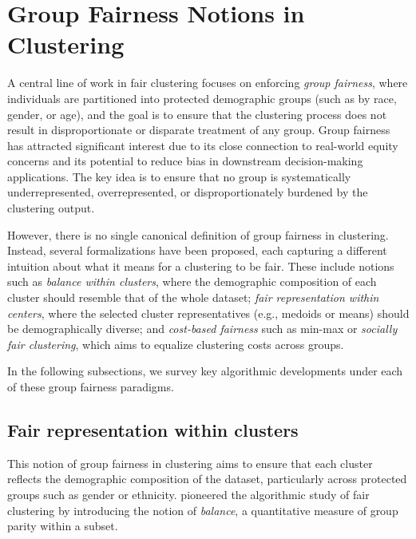 \section{Group Fairness Notions in Clustering}\label{sec:group-fairness}

A central line of work in fair clustering focuses on enforcing \emph{group fairness}, where individuals are partitioned into protected demographic groups (such as by race, gender, or age), and the goal is to ensure that the clustering process does not result in disproportionate or disparate treatment of any group. Group fairness has attracted significant interest due to its close connection to real-world equity concerns and its potential to reduce bias in downstream decision-making applications. The key idea is to ensure that no group is systematically underrepresented, overrepresented, or disproportionately burdened by the clustering output.

However, there is no single canonical definition of group fairness in clustering. Instead, several formalizations have been proposed, each capturing a different intuition about what it means for a clustering to be fair. These include notions such as \emph{balance within clusters}, where the demographic composition of each cluster should resemble that of the whole dataset; \emph{fair representation within centers}, where the selected cluster representatives (e.g., medoids or means) should be demographically diverse; and \emph{cost-based fairness} such as min-max or \emph{socially fair clustering}, which aims to equalize clustering costs across groups.

In the following subsections, we survey key algorithmic developments under each of these group fairness paradigms. 



\subsection{Fair representation within clusters}
This notion of group fairness in clustering aims to ensure that each cluster reflects the demographic composition of the dataset, particularly across protected groups such as gender or ethnicity. \citet{DBLP:conf/nips/Chierichetti0LV17} pioneered the algorithmic study of fair clustering by introducing the notion of \emph{balance}, a quantitative measure of group parity within a subset.





